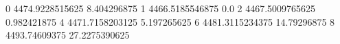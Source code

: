 0 4474.9228515625 8.404296875
1 4466.5185546875 0.0
2 4467.5009765625 0.982421875
4 4471.7158203125 5.197265625
6 4481.3115234375 14.79296875
8 4493.74609375 27.2275390625
